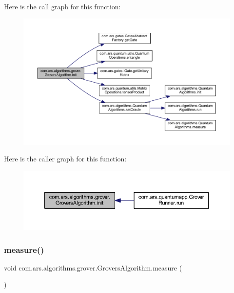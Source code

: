 Here is the call graph for this function\+:\nopagebreak
\begin{figure}[H]
\begin{center}
\leavevmode
\includegraphics[width=350pt]{classcom_1_1ars_1_1algorithms_1_1grover_1_1_grovers_algorithm_ae2825f36c10e6c822aef9da35992bef3_cgraph}
\end{center}
\end{figure}
Here is the caller graph for this function\+:\nopagebreak
\begin{figure}[H]
\begin{center}
\leavevmode
\includegraphics[width=350pt]{classcom_1_1ars_1_1algorithms_1_1grover_1_1_grovers_algorithm_ae2825f36c10e6c822aef9da35992bef3_icgraph}
\end{center}
\end{figure}
\hypertarget{classcom_1_1ars_1_1algorithms_1_1grover_1_1_grovers_algorithm_a8b5729e4882c27f2c4879bd2c7b6d17d}{}\label{classcom_1_1ars_1_1algorithms_1_1grover_1_1_grovers_algorithm_a8b5729e4882c27f2c4879bd2c7b6d17d} 
\subsubsection{\texorpdfstring{measure()}{measure()}}
{\footnotesize\ttfamily void com.\+ars.\+algorithms.\+grover.\+Grovers\+Algorithm.\+measure (\begin{DoxyParamCaption}{ }\end{DoxyParamCaption})}

